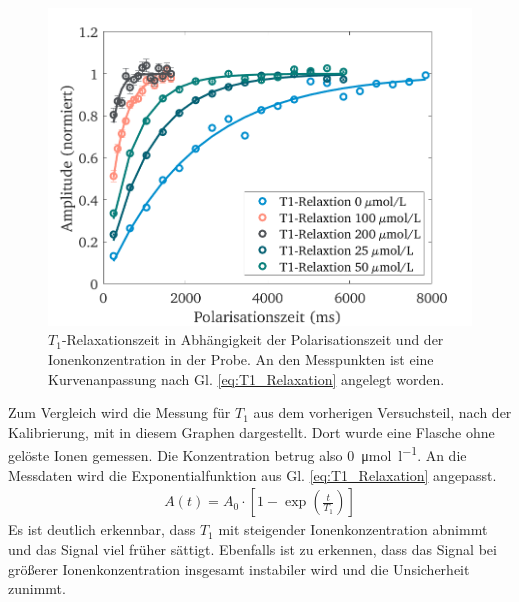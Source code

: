 \documentclass[../main.tex]{subfiles}
\begin{document}
    \begin{figure}[H]
        \centering
        \includegraphics[width=\textwidth]{Bilddateien/11/T1/Part_11_Fig_6}
        \caption{$T_{1}$-Relaxationszeit in Abhängigkeit der Polarisationszeit und der Ionenkonzentration in der Probe. An den Messpunkten ist eine Kurvenanpassung nach Gl. \ref{eq:T1_Relaxation} angelegt worden.}
        \label{fig:Relaxation_T1}
    \end{figure}
    Zum Vergleich wird die Messung für $T_{1}$ aus dem vorherigen Versuchsteil, nach der Kalibrierung, mit in diesem Graphen dargestellt. Dort wurde eine Flasche ohne gelöste Ionen gemessen. Die Konzentration betrug also \SI{0}{\micro \mol \per \litre}. An die Messdaten wird die Exponentialfunktion aus Gl. \ref{eq:T1_Relaxation} angepasst.
    \begin{align} \label{eq:T1_Relaxation}
        A(t) = A_{0} \cdot \left[1 - \exp\left( \frac{t}{T_{1}}\right) \right]
    \end{align}
    Es ist deutlich erkennbar, dass $T_{1}$ mit steigender Ionenkonzentration abnimmt und das Signal viel früher sättigt. Ebenfalls ist zu erkennen, dass das Signal bei größerer Ionenkonzentration insgesamt instabiler wird und die Unsicherheit zunimmt. 
\end{document}

